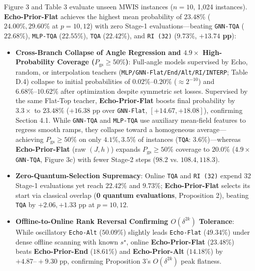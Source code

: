 \documentclass{article}
\theoremstyle{plain}
\theoremstyle{definition}
\begin{document}
Figure 3 and Table 3 evaluate unseen MWIS instances ($n=10$, 1,024 instances). \textbf{Echo-Prior-Flat} achieves the highest mean probability of $\mathbf{23.48}\%$ ($\mathbf{24.00}\%, \mathbf{29.60}\%$ at $p=10,12$) with zero Stage-1 evaluations---beating \texttt{GNN-TQA} ($22.68\%$), \texttt{MLP-TQA} ($22.55\%$), \texttt{TQA} ($22.42\%$), and \texttt{RI (32)} ($9.73\%$, \textbf{$+13.74$ pp}):

\begin{itemize}\setlength{\itemsep}{0pt}\setlength{\parskip}{1pt}\setlength{\topsep}{1pt}
\item \textbf{Cross-Branch Collapse of Angle Regression and $4.9\times$ High-Probability Coverage ($P_{\mathrm{gs}}\ge 50\%$)}: Full-angle models supervised by Echo, random, or interpolation teachers (\texttt{MLP/\allowbreak{}GNN-Flat/\allowbreak{}End/\allowbreak{}Alt/\allowbreak{}RI/\allowbreak{}INTERP}; Table D.4) collapse to initial probabilities of $0.02\%\text{--}0.20\%$ ($\approx 2^{-10}$) and $6.68\%\text{--}10.62\%$ after optimization despite symmetric set losses. Supervised by the same Flat-Top teacher, \textbf{Echo-Prior-Flat} boosts final probability by \textbf{$3.3\times$} to $\mathbf{23.48}\%$ ($+16.38$ pp over \texttt{GNN-Flat}, $[+14.67, +18.08]$), confirming Section 4.1. While \texttt{GNN-TQA} and \texttt{MLP-TQA} use auxiliary mean-field features to regress smooth ramps, they collapse toward a homogeneous average---achieving $P_{\mathrm{gs}}\ge 50\%$ on only \textbf{$4.1\%, 3.5\%$} of instances (\texttt{TQA}: \textbf{$3.6\%$})---whereas \textbf{Echo-Prior-Flat} (raw $(J,h)$) expands $P_{\mathrm{gs}}\ge 50\%$ coverage to \textbf{$\mathbf{20.0}\%$} ($4.9\times$ \texttt{GNN-TQA}, Figure 3c) with fewer Stage-2 steps ($\mathbf{98.2}$ vs. $108.4, 118.3$).
\item \textbf{Zero-Quantum-Selection Supremacy}: Online \texttt{TQA} and \texttt{RI (32)} expend 32 Stage-1 evaluations yet reach $22.42\%$ and $9.73\%$; \textbf{Echo-Prior-Flat} selects its start via classical overlap (\textbf{0 quantum evaluations}, Proposition 2), beating \texttt{TQA} by $+2.06, +1.33$ pp at $p=10,12$.
\item \textbf{Offline-to-Online Rank Reversal Confirming $O(\delta^{2k})$ Tolerance}: While oscillatory \texttt{Echo-Alt} ($50.09\%$) slightly leads \texttt{Echo-Flat} ($49.34\%$) under dense offline scanning with known $s^\star$, online \textbf{Echo-Prior-Flat} ($\mathbf{23.48}\%$) beats \textbf{Echo-Prior-End} ($18.61\%$) and \textbf{Echo-Prior-Alt} ($14.18\%$) by $+4.87\text{--}+9.30$ pp, confirming Proposition 3's $O(\delta^{2k})$ peak flatness.

\end{itemize}
\end{document}
